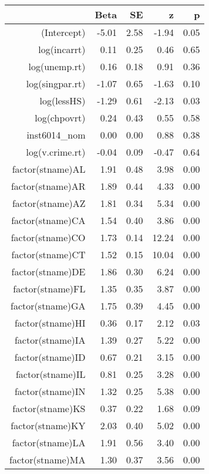 \begin{table}[ht]
\centering
\begin{tabular}{rrrrr}
  \hline
 & Beta & SE & z & p \\ 
  \hline
(Intercept) & -5.01 & 2.58 & -1.94 & 0.05 \\ 
  log(incarrt) & 0.11 & 0.25 & 0.46 & 0.65 \\ 
  log(unemp.rt) & 0.16 & 0.18 & 0.91 & 0.36 \\ 
  log(singpar.rt) & -1.07 & 0.65 & -1.63 & 0.10 \\ 
  log(lessHS) & -1.29 & 0.61 & -2.13 & 0.03 \\ 
  log(chpovrt) & 0.24 & 0.43 & 0.55 & 0.58 \\ 
  inst6014\_nom & 0.00 & 0.00 & 0.88 & 0.38 \\ 
  log(v.crime.rt) & -0.04 & 0.09 & -0.47 & 0.64 \\ 
  factor(stname)AL & 1.91 & 0.48 & 3.98 & 0.00 \\ 
  factor(stname)AR & 1.89 & 0.44 & 4.33 & 0.00 \\ 
  factor(stname)AZ & 1.81 & 0.34 & 5.34 & 0.00 \\ 
  factor(stname)CA & 1.54 & 0.40 & 3.86 & 0.00 \\ 
  factor(stname)CO & 1.73 & 0.14 & 12.24 & 0.00 \\ 
  factor(stname)CT & 1.52 & 0.15 & 10.04 & 0.00 \\ 
  factor(stname)DE & 1.86 & 0.30 & 6.24 & 0.00 \\ 
  factor(stname)FL & 1.35 & 0.35 & 3.87 & 0.00 \\ 
  factor(stname)GA & 1.75 & 0.39 & 4.45 & 0.00 \\ 
  factor(stname)HI & 0.36 & 0.17 & 2.12 & 0.03 \\ 
  factor(stname)IA & 1.39 & 0.27 & 5.22 & 0.00 \\ 
  factor(stname)ID & 0.67 & 0.21 & 3.15 & 0.00 \\ 
  factor(stname)IL & 0.81 & 0.25 & 3.28 & 0.00 \\ 
  factor(stname)IN & 1.32 & 0.25 & 5.38 & 0.00 \\ 
  factor(stname)KS & 0.37 & 0.22 & 1.68 & 0.09 \\ 
  factor(stname)KY & 2.03 & 0.40 & 5.02 & 0.00 \\ 
  factor(stname)LA & 1.91 & 0.56 & 3.40 & 0.00 \\ 
  factor(stname)MA & 1.30 & 0.37 & 3.56 & 0.00 \\ 

\end{tabular}
\end{table}
